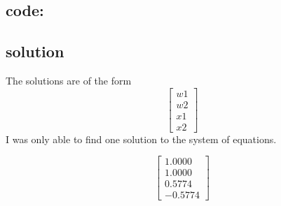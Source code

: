 \documentclass{article}
\begin{document}
\subsection*{code:}

\subsection*{solution}
The solutions are of the form $$\begin{bmatrix}
	w1\\
	w2\\
	x1\\
	x2
\end{bmatrix}$$
I was only able to find one solution to the system of equations.

$$\begin{bmatrix}
	1.0000 \\
	1.0000 \\
	0.5774 \\
	-0.5774 
\end{bmatrix}$$
\end{document}
